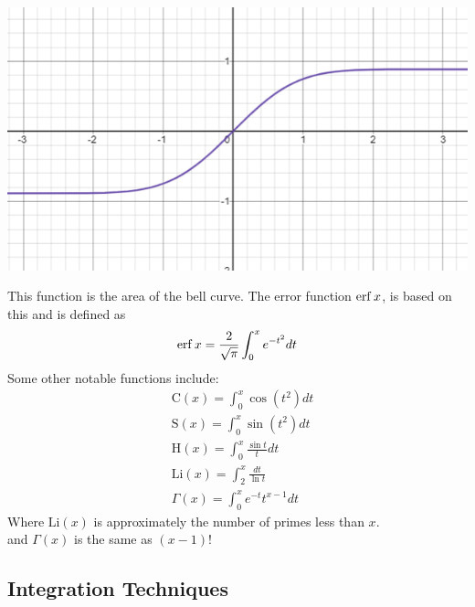 \documentclass[11pt, fleqn]{article}
\begin{document}
\centerline{\includegraphics[scale=0.8]{IntegralCalcPictures/AreaOfBellCurve.png}}
This function is the area of the bell curve. The error function $\operatorname{erf} x$, is based on this and is defined as
$$\operatorname{erf} x=\frac{2}{\sqrt{\pi}}\int_0^xe^{-t^2}dt$$
Some other notable functions include:
\begin{align*}
    &\mathrm{C}(x)=\int_0^x\cos(t^2)dt\\
    &\mathrm{S}(x)=\int_0^x\sin(t^2)dt\\
    &\mathrm{H}(x)=\int_0^x\frac{\sin t}{t}dt\\
    &\mathrm{Li}(x)=\int_2^x\frac{dt}{\ln t}\\
    &\Gamma(x)=\int_0^xe^{-t}t^{x-1}dt
\end{align*}
Where $\mathrm{Li}(x)$ is approximately the number of primes less than $x$.\\
and $\Gamma(x)$ is the same as $(x-1)!$












\subsection{Integration Techniques}
\end{document}
